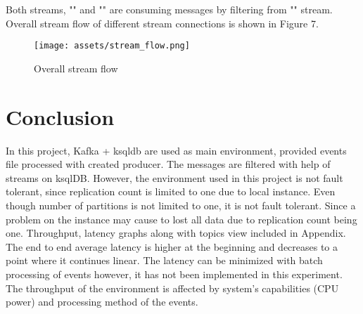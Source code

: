 \documentclass[sigplan,screen]{acmart}
\begin{document}
Both streams, "" and "" are consuming messages by filtering from "" stream. Overall stream flow of different stream connections is shown in Figure 7. 

\begin{figure}[H]
    \centerline{\texttt{[image: assets/stream\_flow.png]}}
    \caption{Overall stream flow  }
    \label{fig}
\end{figure}



\section{Conclusion}
In this project, Kafka + ksqldb are used as main environment, provided events file processed with created producer. The messages are filtered with help of streams on ksqlDB. However, the environment used in this project is not fault tolerant, since replication count is limited to one due to local instance. Even though number of partitions is not limited to one, it is not fault tolerant. Since a problem on the instance may cause to lost all data due to replication count being one. Throughput, latency graphs along with topics view included in Appendix. The end to end average latency is higher at the beginning and decreases to a point where it continues linear. The latency can be minimized with batch processing of events however, it has not been implemented in this experiment. The throughput of the environment is affected by system's capabilities (CPU power) and processing method of the events. 






\onecolumn
\newpage



\end{document}

